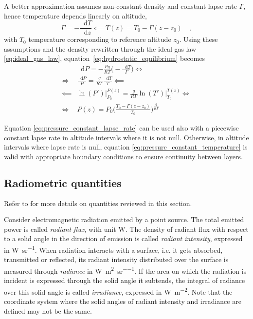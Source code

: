 \documentclass[a4paper,10pt,draft,twocolumn]{article}
\newcommand{\dd}{\mathop{}\!\mathrm{d}}
\begin{document}
A better approximation assumes non-constant density and constant lapse rate $\Gamma$, hence temperature depends linearly on altitude,
\begin{equation}
  \label{eq:constant_lapse_rate}
  \Gamma = - \frac{\dd T}{\dd z} \impliedby T(z) = T_0 - \Gamma (z - z_0)
  \quad ,
\end{equation}
with $T_0$ temperature corresponding to reference altitude $z_0$. Using these assumptions and the density rewritten through the ideal gas law \eqref{eq:ideal_gas_law}, equation~\eqref{eq:hydrostatic_equilibrium} becomes
\begin{equation}
  \label{eq:pressure_constant_lapse_rate}
  \begin{split}
    & \dd P = - \frac{P g}{R T} \bigg( - \frac{\dd T}{\Gamma} \bigg) \iff \\
    \iff & \frac{\dd P}{P} = \frac{g}{R \Gamma} \frac{\dd T}{T} \impliedby \\
    \impliedby & \ln(P') \bigg|_{P_0}^{P(z)} = \frac{g}{R \Gamma} \ln(T') \bigg|_{T_0}^{T(z)} \iff \\
    \iff & P(z) = P_0 \bigg( \frac{T_0 - \Gamma (z - z_0)}{T_0} \bigg)^\frac{g}{R \Gamma}
  \end{split}
\end{equation}

Equation \eqref{eq:pressure_constant_lapse_rate} can be used also with a piecewise constant lapse rate in altitude intervals where it is not null. Otherwise, in altitude intervals where lapse rate is null, equation \eqref{eq:pressure_constant_temperature} is valid with appropriate boundary conditions to ensure continuity between layers.

\subsection{Radiometric quantities}
\label{sec:Radiometric quantities}
Refer to \cite{CIE} for more details on quantities reviewed in this section.

Consider electromagnetic radiation emitted by a point source. The total emitted power is called \emph{radiant flux}, with unit \unit{\watt}. The density of radiant flux with respect to a solid angle in the direction of emission is called \emph{radiant intensity}, expressed in \unit{\watt\per\steradian}. When radiation interacts with a surface, i.e. it gets absorbed, transmitted or reflected, its radiant intensity distributed over the surface is measured through \emph{radiance} in \unit{\watt\per\square\metre\per\steradian}. If the area on which the radiation is incident is expressed through the solid angle it subtends, the integral of radiance over this solid angle is called \emph{irradiance}, expressed in \unit{\watt\per\square\metre}. Note that the coordinate system where the solid angles of radiant intensity and irradiance are defined may not be the same.
\end{document}
